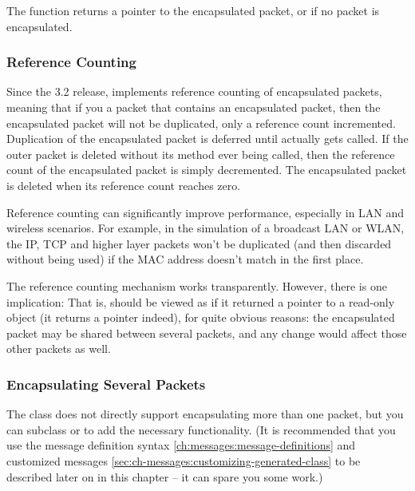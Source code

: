 The  function returns a pointer to the encapsulated
packet, or  if no packet is encapsulated.


\subsubsection{Reference Counting}
\label{ch:messages:reference-counting}

Since the 3.2 release, {\opp} implements reference counting of
encapsulated packets, meaning that if you  a packet
that contains an encapsulated packet, then the encapsulated packet will
not be duplicated, only a reference count incremented. Duplication of
the encapsulated packet is deferred until 
actually gets called. If the outer packet is deleted without its
 method ever being called, then the reference
count of the encapsulated packet is simply decremented. The
encapsulated packet is deleted when its reference count reaches
zero.

Reference counting can significantly improve performance, especially
in LAN and wireless scenarios. For example, in the simulation of a
broadcast LAN or WLAN, the IP, TCP and higher layer packets won't
be duplicated (and then discarded without being used) if the
MAC address doesn't match in the first place.

The reference counting mechanism works transparently. However, there
is one implication:  That is,
 should be viewed as if it returned a
pointer to a read-only object (it returns a  pointer
indeed), for quite obvious reasons: the encapsulated packet may be
shared between several packets, and any change would affect those
other packets as well.


\subsubsection{Encapsulating Several Packets}

The  class does not directly support encapsulating more
than one packet, but you can subclass  or 
to add the necessary functionality. (It is recommended that you
use the message definition syntax \ref{ch:messages:message-definitions}
and customized messages \ref{sec:ch-messages:customizing-generated-class}
to be described later on in this chapter -- it can spare you some work.)

